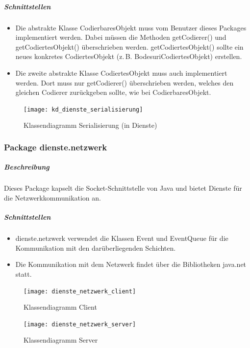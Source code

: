 \documentclass[12pt,halfparskip]{scrartcl}
\begin{document}
\subparagraph{Schnittstellen}
\begin{itemize}
	\item Die abstrakte Klasse CodierbaresObjekt muss vom Benutzer dieses Packages implementiert werden. Dabei müssen die Methoden getCodierer() und getCodiertesObjekt() überschrieben werden. getCodiertesObjekt() sollte ein neues konkretes CodiertesObjekt (z.\,B. BodesuriCodiertesObjekt) erstellen.
	\item Die zweite abstrakte Klasse CodiertesObjekt muss auch implementiert werden. Dort muss nur getCodierer() überschrieben werden, welches den gleichen Codierer zurückgeben sollte, wie bei CodierbaresObjekt.
\end{itemize}

\begin{figure}[h]
	\centering
	\texttt{[image: kd\_dienste\_serialisierung]}
	\caption{Klassendiagramm Serialisierung (in Dienste)}
	\label{fig:kd_dienste_serialisierung}
\end{figure}

\clearpage
\subsubsection{Package dienste.netzwerk} %
\label{ssub:package_dienste_netzwerk}
\subparagraph{Beschreibung}
Dieses Package kapselt die Socket-Schnittstelle von Java und bietet Dienste für die Netzwerkkommunikation an.

\subparagraph{Schnittstellen} %
\label{ssub:schnittstellen}
\begin{itemize}
	\item dienste.netzwerk verwendet die Klassen Event und EventQueue für die Kommunikation mit den darüberliegenden Schichten.
	\item Die Kommunikation mit dem Netzwerk findet über die Bibliotheken java.net statt.
\end{itemize}

\begin{figure}[h]
	\centering
	\texttt{[image: dienste\_netzwerk\_client]}
	\caption{Klassendiagramm Client}
	\label{fig:dienste_netzwerk_client}
\end{figure}

\begin{figure}[h]
	\centering
	\texttt{[image: dienste\_netzwerk\_server]}
	\caption{Klassendiagramm Server}
	\label{fig:dienste_netzwerk_server}
\end{figure}

\end{document}
